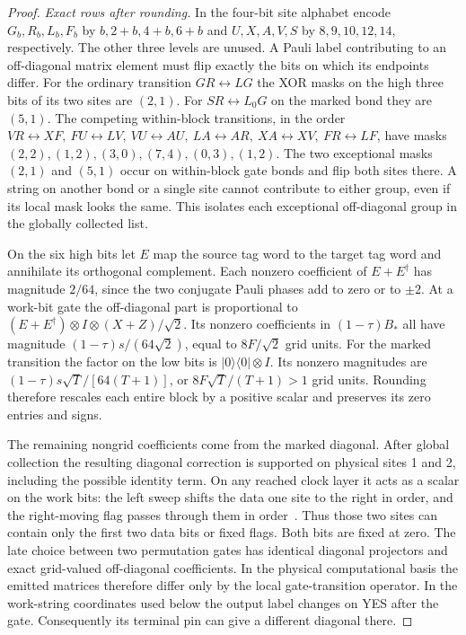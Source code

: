 \documentclass[11pt]{article}
\newcommand{\ket}[1]{\lvert #1\rangle}
\newcommand{\bra}[1]{\langle #1\rvert}
\begin{document}
\begin{proof}
\emph{Exact rows after rounding.}
In the four-bit site alphabet encode \(G_b,R_b,L_b,F_b\) by \(b,2+b,4+b,6+b\) and \(U,X,A,V,S\) by \(8,9,10,12,14\), respectively. The other three levels are unused. A Pauli label contributing to an off-diagonal matrix element must flip exactly the bits on which its endpoints differ. For the ordinary transition \(GR\leftrightarrow LG\) the XOR masks on the high three bits of its two sites are \((2,1)\). For \(SR\leftrightarrow L_0G\) on the marked bond they are \((5,1)\). The competing within-block transitions, in the order \(VR\leftrightarrow XF,\ FU\leftrightarrow LV,\ VU\leftrightarrow AU,\ LA\leftrightarrow AR,\ XA\leftrightarrow XV,\ FR\leftrightarrow LF\), have masks \((2,2),(1,2),(3,0),(7,4),(0,3),(1,2)\). The two exceptional masks \((2,1)\) and \((5,1)\) occur on within-block gate bonds and flip both sites there. A string on another bond or a single site cannot contribute to either group, even if its local mask looks the same. This isolates each exceptional off-diagonal group in the globally collected list.

On the six high bits let \(E\) map the source tag word to the target tag word and annihilate its orthogonal complement. Each nonzero coefficient of \(E+E^\dagger\) has magnitude \(2/64\), since the two conjugate Pauli phases add to zero or to \(\pm2\). At a work-bit gate the off-diagonal part is proportional to
\((E+E^\dagger)\otimes I\otimes (X+Z)/\sqrt2\).
Its nonzero coefficients in \((1-\tau)B_*\) all have magnitude \((1-\tau)s/(64\sqrt2)\), equal to \(8F/\sqrt2\) grid units. For the marked transition the factor on the low bits is \(\ket0\bra0\otimes I\). Its nonzero magnitudes are \((1-\tau)s\sqrt T/[64(T+1)]\), or \(8F\sqrt T/(T+1)>1\) grid units. Rounding therefore rescales each entire block by a positive scalar and preserves its zero entries and signs.

The remaining nongrid coefficients come from the marked diagonal. After global collection the resulting diagonal correction is supported on physical sites 1 and 2, including the possible identity term. On any reached clock layer it acts as a scalar on the work bits: the left sweep shifts the data one site to the right in order, and the right-moving flag passes through them in order~\cite[Sec.~2, rules 1--6 and Fig.~1]{agik}. Thus those two sites can contain only the first two data bits or fixed flags. Both bits are fixed at zero. The late choice between two permutation gates has identical diagonal projectors and exact grid-valued off-diagonal coefficients. In the physical computational basis the emitted matrices therefore differ only by the local gate-transition operator. In the work-string coordinates used below the output label changes on YES after the gate. Consequently its terminal pin can give a different diagonal there.


\end{proof}
\end{document}
